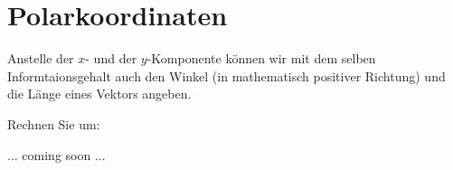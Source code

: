 
\section{Polarkoordinaten}

Anstelle der $x$- und der $y$-Komponente können wir mit dem selben
Informtaionsgehalt auch den Winkel
(in mathematisch positiver Richtung) und die Länge eines Vektors
angeben.

Rechnen Sie um:

... coming soon ...
